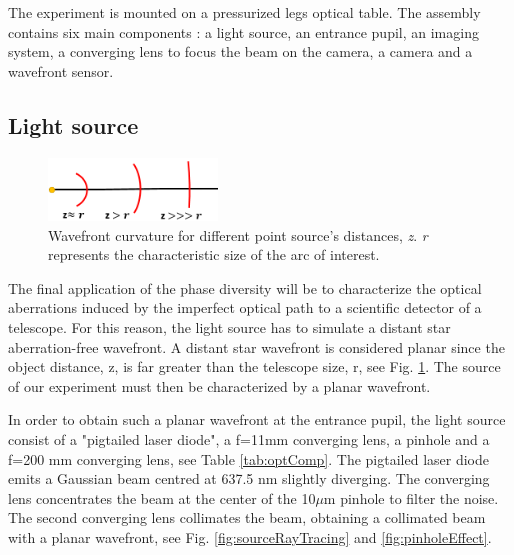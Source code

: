 The experiment is mounted on a pressurized legs optical table. The assembly contains six main components : a light source, an entrance pupil, an imaging system, a converging lens to focus the beam on the camera, a camera and a wavefront sensor.

\subsection{Light source}
\label{subsec:LigthSource}

\begin{minipage}{\linewidth}
\begin{figure}
\centering
\includegraphics[width=0.4\textwidth]{Figures/WFdistantSource.PNG}
\decoRulewrapFig
\caption[Wavefront curvature]{Wavefront curvature for different point source's distances, \textit{z}. \textit{r} represents the characteristic size of the arc of interest.}
\label{fig:WFdistantSource}
\end{figure}

The final application of the phase diversity will be to characterize the optical aberrations induced by the imperfect optical path to a scientific detector of a telescope. For this reason, the light source has to simulate a distant star aberration-free wavefront. A distant star wavefront is considered planar since the object distance, z, is far greater than the telescope size, r, see Fig. \ref{fig:WFdistantSource}. The source of our experiment must then be characterized by a planar wavefront.

In order to obtain such a planar wavefront at the entrance pupil, the light source consist of a "pigtailed laser diode", a f=11mm converging lens, a pinhole and a f=200 mm converging lens, see Table \ref{tab:optComp}. The pigtailed laser diode emits a Gaussian beam centred at 637.5 nm slightly diverging. The converging lens concentrates the beam at the center of the 10$\mu$m pinhole to filter the noise. The second converging lens collimates the beam, obtaining a collimated beam with a planar wavefront, see Fig. \ref{fig:sourceRayTracing} and \ref{fig:pinholeEffect}.

\end{minipage}

